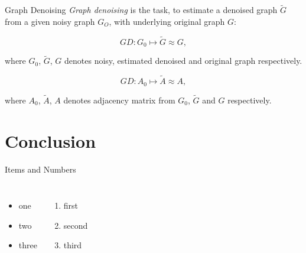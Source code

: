 \documentclass[aspectratio=169]{beamer}
\begin{document}
\begin{frame}[c]{Graph Denoising}
    \textit{Graph denoising} is the task, to estimate a denoised graph $\tilde{G}$  
    from a given noisy graph $G_O$, with underlying original graph $G$:

    \begin{definition}
        $$GD: G_0 \mapsto \tilde{G} \approx G,$$
    \end{definition}
    where $G_0$, $\tilde{G}$, $G$ denotes noisy, estimated denoised and original graph respectively.
    
    \begin{definition}
        $$GD: A_0 \mapsto \tilde{A} \approx A,$$
    \end{definition}
    where $A_0$, $\tilde{A}$, $A$ denotes adjacency matrix from $G_0$, $\tilde{G}$ and $G$ respectively.

\end{frame}

\section{Conclusion}


\begin{frame}[t]{Items and Numbers}
\begin{columns}
            \begin{itemize}
            \item one
            \item two
            \item three
            \end{itemize}
            \begin{enumerate}
            \item first
            \item second
            \item third
            \end{enumerate}
\end{columns}
\end{frame}


\begin{frame}[t,plain]
\end{frame}

\backupbegin


\backupend
\end{document}
